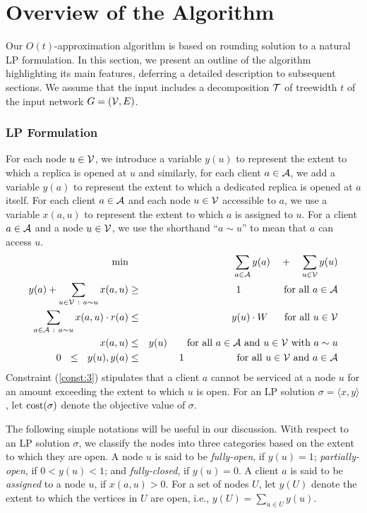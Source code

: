 \documentclass[11pt]{article}
\newcommand{\mypara}[1] {\subsubsection*{#1}}
\newcommand{\calA} {{\cal A}}
\newcommand{\calV} {{\cal V}}
\newcommand{\pair}[2] {\langle #1, #2\rangle}
\newcommand{\cost} {{\rm cost}}
\newcommand{\calT} {{\cal T}}
\begin{document}
\section{Overview of the Algorithm}
Our $O(t)$-approximation algorithm is based on rounding solution to a natural LP formulation.
In this section, we present an outline of the algorithm 
highlighting its main features, deferring a detailed description to subsequent sections.
We assume that the input includes a decomposition $\calT$ of treewidth $t$ of the input network $G=(\calV, E)$.


\mypara{LP Formulation}
For each node $u\in \calV$, we introduce a variable $y(u)$ to represent the extent to which a replica is opened at $u$
and similarly, for each client $a\in \calA$, we add a variable $y(a)$ to represent the extent to which a dedicated replica is opened
at $a$ itself.
For each client $a\in \calA$ and each node $u\in \calV$ accessible to $a$,
we use a variable $x(a,u)$ to represent the extent to which $a$ is assigned to $u$.
For a client $a \in \calA$ and a node $u\in \calV$, we use the shorthand ``$a\sim u$'' to mean that $a$ can access $u$.
%
\begin{eqnarray}
\nonumber
\min & & \sum_{a\in \calA} y(a) \quad + \quad \sum_{u \in \calV} y(u) \\
y(a) + \sum_{u\in\calV~:~a\sim u} x(a,u) & \geq & 1 \quad \quad \quad \mbox{~~~~for all $a\in \calA$} \\
\sum_{a\in\calA~:~a\sim u} x(a,u)\cdot r(a) & \leq & y(u) \cdot W \quad \mbox{~~for all $u\in \calV$}\\
\label{const:3}
x(a,u) &\leq& y(u) \quad \quad \mbox{for all $a\in \calA$ and $u\in \calV$ with $a\sim u$}\\
0 \ \ \leq \ \ y(u), y(a) &\leq& 1 \quad \quad \quad \quad \mbox{~~~~for all $u\in \calV$ and $a\in \calA$}
\end{eqnarray}
%
Constraint (\ref{const:3}) stipulates that a client $a$ cannot be serviced at a node $u$ 
for an amount exceeding the extent to which $u$ is open.
For an LP solution $\sigma=\pair{x}{y}$, let $\cost(\sigma)$ denote the objective value of $\sigma$.

The following simple notations will be useful in our discussion.
With respect to an LP solution $\sigma$, we classify the nodes into three categories
based on the extent to which they are open. A node $u$ is said to be {\em fully-open}, if $y(u)=1$;
{\em partially-open}, if $0 < y(u) < 1$; and {\em fully-closed}, if $y(u) = 0$.
A client $a$ is said to be {\em assigned} to a node $u$, if $x(a,u) > 0$.
For a set of nodes $U$, let $y(U)$ denote the extent to which the vertices in $U$ are open,
i.e., $y(U) = \sum_{u\in U} y(u)$.
\end{document}
